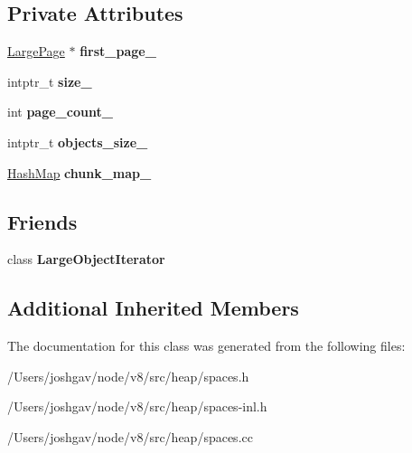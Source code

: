 \subsection*{Private Attributes}
\begin{DoxyCompactItemize}
\item 
\hyperlink{classv8_1_1internal_1_1_large_page}{Large\+Page} $\ast$ {\bfseries first\+\_\+page\+\_\+}\hypertarget{classv8_1_1internal_1_1_large_object_space_a39d24b8de763ca62ed9874a9aff81826}{}\label{classv8_1_1internal_1_1_large_object_space_a39d24b8de763ca62ed9874a9aff81826}

\item 
intptr\+\_\+t {\bfseries size\+\_\+}\hypertarget{classv8_1_1internal_1_1_large_object_space_a3133763fd5578a8ac61859487b18d7eb}{}\label{classv8_1_1internal_1_1_large_object_space_a3133763fd5578a8ac61859487b18d7eb}

\item 
int {\bfseries page\+\_\+count\+\_\+}\hypertarget{classv8_1_1internal_1_1_large_object_space_ad6dfc04a22436ec514721204217a17fa}{}\label{classv8_1_1internal_1_1_large_object_space_ad6dfc04a22436ec514721204217a17fa}

\item 
intptr\+\_\+t {\bfseries objects\+\_\+size\+\_\+}\hypertarget{classv8_1_1internal_1_1_large_object_space_aff752a5f85808250ea08fd16d1116a35}{}\label{classv8_1_1internal_1_1_large_object_space_aff752a5f85808250ea08fd16d1116a35}

\item 
\hyperlink{classv8_1_1internal_1_1_template_hash_map_impl}{Hash\+Map} {\bfseries chunk\+\_\+map\+\_\+}\hypertarget{classv8_1_1internal_1_1_large_object_space_a4187bc132841fd71e75d94b763072e37}{}\label{classv8_1_1internal_1_1_large_object_space_a4187bc132841fd71e75d94b763072e37}

\end{DoxyCompactItemize}
\subsection*{Friends}
\begin{DoxyCompactItemize}
\item 
class {\bfseries Large\+Object\+Iterator}\hypertarget{classv8_1_1internal_1_1_large_object_space_a3bc21bcf0ff3a8b52c6a491296fce3f2}{}\label{classv8_1_1internal_1_1_large_object_space_a3bc21bcf0ff3a8b52c6a491296fce3f2}

\end{DoxyCompactItemize}
\subsection*{Additional Inherited Members}


The documentation for this class was generated from the following files\+:\begin{DoxyCompactItemize}
\item 
/\+Users/joshgav/node/v8/src/heap/spaces.\+h\item 
/\+Users/joshgav/node/v8/src/heap/spaces-\/inl.\+h\item 
/\+Users/joshgav/node/v8/src/heap/spaces.\+cc\end{DoxyCompactItemize}
